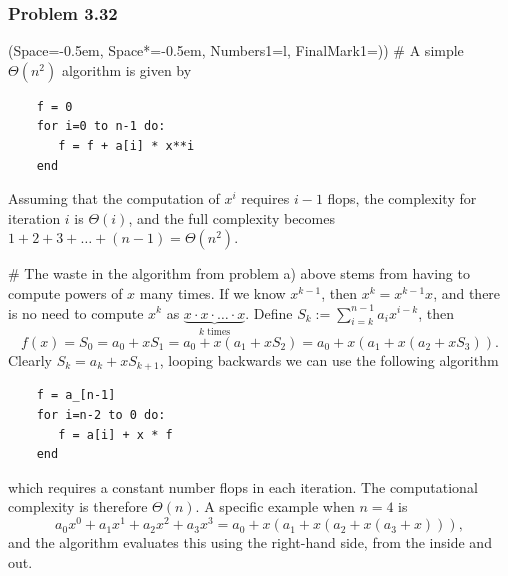 \documentclass[12pt, a4paper]{article}
\newcommand{\listSpace}{-0.5em}%
\begin{document}
\subsubsection*{Problem 3.32}
\begin{easylist}[enumerate]
\ListProperties(Space=\listSpace, Space*=\listSpace, Numbers1=l, FinalMark1={)})
# A simple $\Theta(n^2)$ algorithm is given by
\begin{lstlisting}
	f = 0
	for i=0 to n-1 do:
	   f = f + a[i] * x**i
	end
\end{lstlisting}
Assuming that the computation of $x^i$ requires $i-1$ flops, the complexity for iteration $i$ is $\Theta(i)$, and the full complexity becomes $1 + 2 + 3 + \dots + (n-1) = \Theta(n^2)$.

# The waste in the algorithm from problem a) above stems from having to compute powers of $x$ many times.
If we know $x^{k-1}$, then $x^k = x^{k-1} x$, and there is no need to compute $x^k$ as $\underbrace{x \cdot x \cdot \ldots \cdot x}_{k \text{ times}}$.
Define $S_k := \sum_{i=k}^{n-1} a_i x^{i-k}$, then
\begin{equation*}
	f(x) = S_0 = a_0 + x S_1 = a_0 + x\left( a_1 +x  S_2 \right) = a_0 + x\left( a_1 + x\left( a_2 + xS_3 \right) \right).
\end{equation*}
Clearly $S_k = a_k + x S_{k+1}$, looping backwards we can use the following algorithm
\begin{lstlisting}
	f = a_[n-1]
	for i=n-2 to 0 do:
	   f = a[i] + x * f
	end
\end{lstlisting}
which requires a constant number flops in each iteration.
The computational complexity is therefore $\Theta(n)$.
A specific example when $n=4$ is
\begin{equation*}
	a_0 x^0 + a_1 x^1 +a_2 x^2 +a_3 x^3 = a_0 + x (a_1 + x (a_2 + x (a_3 + x))),
\end{equation*}
and the algorithm evaluates this using the right-hand side, from the inside and out.

\end{easylist}
\end{document}
